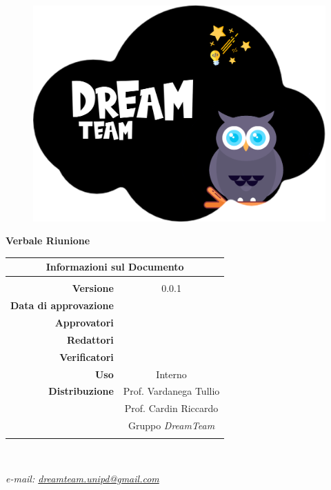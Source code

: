 \begin{center}

\begin{figure}
\centering
\includegraphics[scale=0.05]{Sezioni/images/DreamTeam.png} 
\end{figure}

{\Huge{\textbf{Verbale Riunione \D{}}}} \\ [1cm]

\begin{table}[htbp]
\centering
\begin{tabular}{r|c}
\multicolumn{2}{c}{\textbf{Informazioni sul Documento}} \\
\hline \\
\textbf{Versione} & 0.0.1 \\ \rule{0pt}{3ex}  
\textbf{Data di approvazione} &  \\ \rule{0pt}{3ex}  
\textbf{Approvatori} &  \\ \rule{0pt}{3ex}      
\textbf{Redattori} & \PV{} \\ \rule{0pt}{2ex}
\textbf{Verificatori} &   \\ \rule{0pt}{3ex}       
\textbf{Uso} & Interno \\ \rule{0pt}{3ex}    
\textbf{Distribuzione} & Prof. Vardanega Tullio \\ \rule{0pt}{2ex}   
& Prof. Cardin Riccardo \\ \rule{0pt}{2ex}   
& Gruppo \textit{DreamTeam} \\ \rule{0pt}{0.1cm}   
\end{tabular} \\ [0.5cm]
\end{table}

\textsl{ e-mail: \href{mailto:dreamteam.unipd@gmail.com}{dreamteam.unipd@gmail.com} } \\[2cm]
\end{center}
\pagebreak